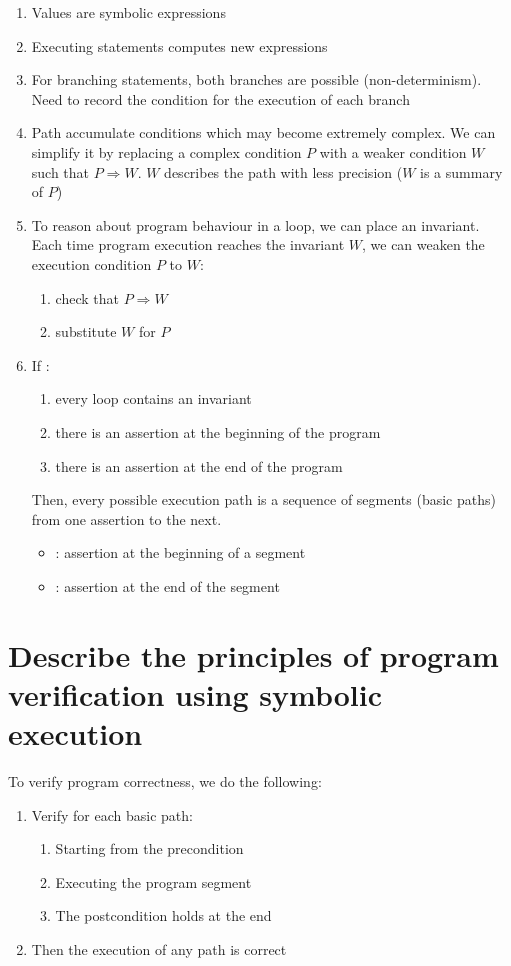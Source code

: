 \begin{enumerate}
    \item Values are symbolic expressions
    \item Executing statements computes new expressions
    \item For branching statements, both branches are possible (non-determinism). Need to record the condition for the execution of each branch
    \item Path accumulate conditions which may become extremely complex. We can simplify it by replacing a complex condition $P$ with a weaker condition $W$ such that $P \Rightarrow W$. $W$ describes the path with less precision ($W$ is a summary of $P$)
    \item To reason about program behaviour in a loop, we can place an invariant. Each time program execution reaches the invariant $W$, we can weaken the execution condition $P$ to $W$:
    \begin{enumerate}
        \item check that $P \Rightarrow W$
        \item substitute $W$ for $P$
    \end{enumerate}
    \item If : 
    \begin{enumerate}
        \item every loop contains an invariant
        \item there is an assertion at the beginning of the program
        \item there is an assertion at the end of the program
    \end{enumerate}
    Then, every possible execution path is a sequence of segments (basic paths) from one assertion to the next.
    \begin{itemize}
        \item {} : assertion at the beginning of a segment
        \item {} : assertion at the end of the segment
    \end{itemize}
\end{enumerate}

\section{Describe the principles of program verification using symbolic execution}

To verify program correctness, we do the following:
\begin{enumerate}
    \item Verify for each basic path:
    \begin{enumerate}
        \item Starting from the precondition
        \item Executing the program segment
        \item The postcondition holds at the end
    \end{enumerate}
    \item Then the execution of any path is correct
\end{enumerate}


